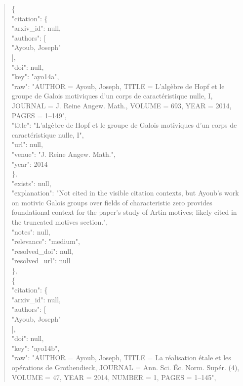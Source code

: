 \documentclass[11pt]{article}
\begin{document}
\begin{quote}
    \{\\
      "citation": \{\\
        "arxiv\_id": null,\\
        "authors": [\\
          "Ayoub, Joseph"\\
        ],\\
        "doi": null,\\
        "key": "ayo14a",\\
        "raw": "AUTHOR = Ayoub, Joseph, TITLE = L'algèbre de Hopf et le groupe de Galois motiviques d'un corps de caractéristique nulle, I, JOURNAL = J. Reine Angew. Math., VOLUME = 693, YEAR = 2014, PAGES = 1--149",\\
        "title": "L'algèbre de Hopf et le groupe de Galois motiviques d'un corps de caractéristique nulle, I",\\
        "url": null,\\
        "venue": "J. Reine Angew. Math.",\\
        "year": 2014\\
      \},\\
      "exists": null,\\
      "explanation": "Not cited in the visible citation contexts, but Ayoub's work on motivic Galois groups over fields of characteristic zero provides foundational context for the paper's study of Artin motives; likely cited in the truncated motives section.",\\
      "notes": null,\\
      "relevance": "medium",\\
      "resolved\_doi": null,\\
      "resolved\_url": null\\
    \},\\
    \{\\
      "citation": \{\\
        "arxiv\_id": null,\\
        "authors": [\\
          "Ayoub, Joseph"\\
        ],\\
        "doi": null,\\
        "key": "ayo14b",\\
        "raw": "AUTHOR = Ayoub, Joseph, TITLE = La réalisation étale et les opérations de Grothendieck, JOURNAL = Ann. Sci. Éc. Norm. Supér. (4), VOLUME = 47, YEAR = 2014, NUMBER = 1, PAGES = 1--145",\\

\end{quote}
\end{document}

